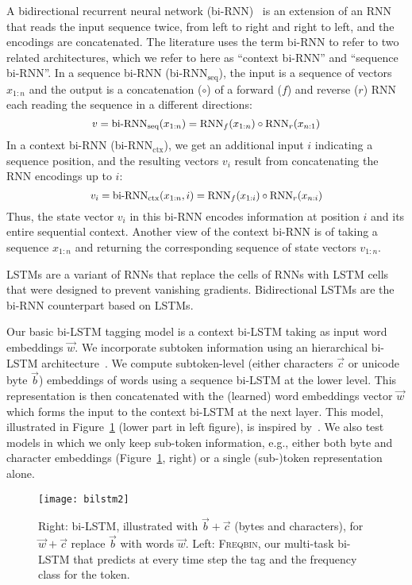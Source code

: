 \documentclass[11pt]{article}
\begin{document}
A bidirectional recurrent neural network (bi-RNN)~\cite{graves:schmidhuber:2005} is an extension of an RNN that reads the input sequence twice, 
from left to right and right to left, and the encodings are concatenated. 
The literature uses the term bi-RNN to refer to two related architectures, which we refer to here as ``context bi-RNN'' and ``sequence bi-RNN''.
In a sequence bi-RNN (bi-RNN$_{\text{seq}}$), the input is a sequence of vectors $x_{1:n}$ and the output is a concatenation ($\circ$) of a forward ($f$) and reverse ($r$) 
RNN each reading the sequence in a different directions:
\[ \scalebox{.95}{$ v = \text{bi-RNN}_\text{seq}(x_{1:n}) = \text{RNN}_f(x_{1:n}) \circ \text{RNN}_r(x_{n:1}) $} \]
In a context bi-RNN (bi-RNN$_{\text{ctx}}$), we get an additional input $i$ indicating a sequence position, and the resulting vectors $v_i$ result from concatenating the RNN encodings up to $i$: 
\[ \scalebox{.93}{$ v_i = \text{bi-RNN}_\text{ctx}(x_{1:n},i) = \text{RNN}_f(x_{1:i}) \circ \text{RNN}_r(x_{n:i}) $} \]
Thus, the state vector $v_i$ in this bi-RNN encodes information 
at position $i$ and its entire sequential context.
Another view of the context bi-RNN is of taking a sequence $x_{1:n}$ and returning the corresponding sequence of state vectors $v_{1:n}$.


LSTMs \cite{Hochreiter:Schmidhuber:97} are a variant of RNNs that replace the cells of RNNs
with LSTM cells that were designed to prevent vanishing gradients. 
Bidirectional LSTMs are the bi-RNN counterpart based on LSTMs.



Our basic bi-LSTM tagging model is a context bi-LSTM taking as input word embeddings $\vec{w}$. 
We incorporate subtoken information using an hierarchical bi-LSTM architecture~\cite{ling:ea:2015,ballesteros:ea:2015}. 
We compute subtoken-level (either characters $\vec{c}$ or unicode byte $\vec{b}$) embeddings of words 
using a sequence bi-LSTM at the lower level. This representation is then concatenated with the (learned) word 
embeddings vector $\vec{w}$ which forms the input to the context bi-LSTM at the next layer. 
This model, illustrated in Figure~\ref{fig:bilstm} (lower part in left figure), is inspired by~. 
We also test models in which we only keep sub-token information, e.g., either both byte and character 
embeddings (Figure~\ref{fig:bilstm}, right) or a single (sub-)token representation alone. 

\begin{figure}[ht!]\centering
\texttt{[image: bilstm2]}
\caption{Right: bi-LSTM, illustrated with $\vec{b}+\vec{c}$ (bytes and characters), for $\vec{w}+\vec{c}$  replace $\vec{b}$ with words $\vec{w}$. Left: \textsc{Freqbin}, our multi-task bi-LSTM that predicts at every time step the tag and the frequency class for the token.}
\label{fig:bilstm}
\end{figure}
\end{document}
